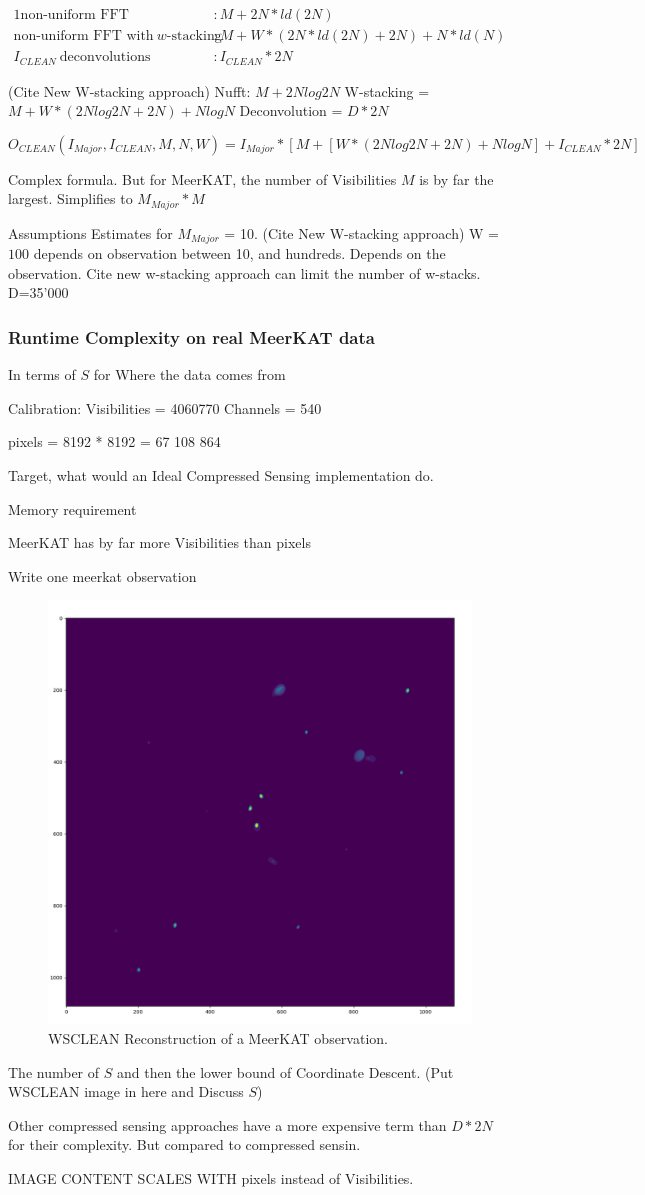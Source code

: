 \begin{alignat*}{1}
	\text{non-uniform FFT} &: M + 2N*ld(2N)\\
	\text{non-uniform FFT with} \:w\text{-stacking} &:M + W*(2N*ld(2N) + 2N) + N*ld(N)\\
	I_{CLEAN}\: \text{deconvolutions} &: I_{CLEAN}*2N
\end{alignat*}

(Cite New W-stacking approach)
Nufft: $M + 2N log 2N$
W-stacking = $M + W*(2N log 2N + 2N) + N log N$
Deconvolution = $D*2N$


\begin{equation}
O_{CLEAN}(I_{Major}, I_{CLEAN}, M, N,  W) = I_{Major} * [M + [W*(2N log 2N + 2N) + N log N] + I_{CLEAN}*2N]
\end{equation}

Complex formula. But for MeerKAT, the number of Visibilities $M$ is by far the largest. Simplifies to $M_{Major}*M$

Assumptions
Estimates for $M_{Major}$ = 10. (Cite New W-stacking approach)
W = $100$ depends on observation between 10, and hundreds. Depends on the observation. Cite new w-stacking approach can limit the number of w-stacks. 
D=35'000

\subsubsection{Runtime Complexity on real MeerKAT data}
In terms of $S$ for 
Where the data comes from

Calibration: 
Visibilities = 4060770
Channels = 540

pixels = 8192 * 8192 = 67 108 864

Target, what would an Ideal Compressed Sensing implementation do.

Memory requirement

MeerKAT has by far more Visibilities than pixels

Write one meerkat observation

\begin{figure}[h]
	\centering
	\includegraphics[width=0.5\linewidth]{./chapters/05.algorithms/sim00/full_cache_debug.png}
	\caption{WSCLEAN Reconstruction of a MeerKAT observation.}
	\label{results:wsclean}
\end{figure}
The number of $S$ and then the lower bound of Coordinate Descent. (Put WSCLEAN image in here and Discuss $S$)



Other compressed sensing approaches have a more expensive term than $D*2N$ for their complexity. But compared to compressed sensin.


IMAGE CONTENT SCALES WITH pixels instead of Visibilities.

